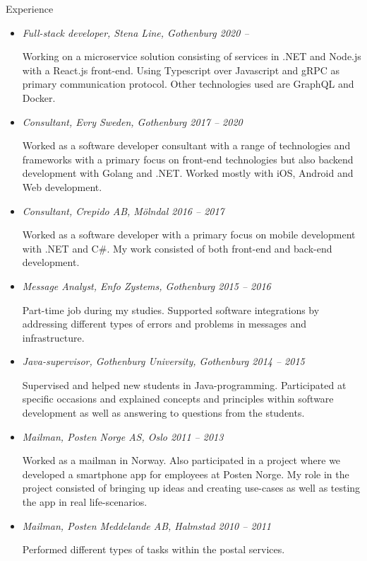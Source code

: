 {\itshape\Large\begin{center}
Experience
\end{center}}

\vspace{12px}

\begin{itemize}
  \item {\itshape Full-stack developer, Stena Line, Gothenburg 2020 –}

  Working on a microservice solution consisting of services in .NET and Node.js with a React.js front-end.
  Using Typescript over Javascript and gRPC as primary communication protocol. Other technologies used are
  GraphQL and Docker.

  \item {\itshape Consultant, Evry Sweden, Gothenburg 2017 – 2020}

  Worked as a software developer consultant with a range of technologies and
  frameworks with a primary focus on front-end technologies but also backend development with Golang and .NET.
  Worked mostly with iOS, Android and Web development.

  \item {\itshape Consultant, Crepido AB, Mölndal 2016 – 2017}

  Worked as a software developer with a primary focus on mobile development with
  .NET and C\#. My work consisted of both front-end and back-end development.

  \item {\itshape Message Analyst, Enfo Zystems, Gothenburg 2015 – 2016}

  Part-time job during my studies. Supported software integrations by addressing
  different types of errors and problems in messages and infrastructure.

  \item {\itshape Java-supervisor, Gothenburg University, Gothenburg 2014 – 2015}

  Supervised and helped new students in Java-programming. Participated at specific
  occasions and explained concepts and principles within software development as
  well as answering to questions from the students.

  \item {\itshape Mailman, Posten Norge AS, Oslo 2011 – 2013}

  Worked as a mailman in Norway. Also participated in a project where we developed
  a smartphone app for employees at Posten Norge. My role in the project consisted
  of bringing up ideas and creating use-cases as well as testing the app in real life-scenarios.

  \item {\itshape Mailman, Posten Meddelande AB, Halmstad 2010 – 2011}

  Performed different types of tasks within the postal services.

\end{itemize}

